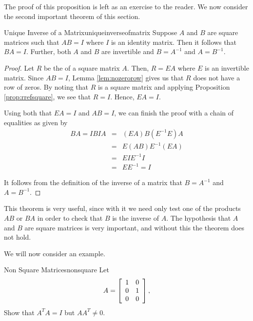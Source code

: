 The proof of this proposition is left as an exercise to the reader. 
We now consider the second important theorem of this section. 

\begin{theorem}{Unique Inverse of a Matrix}{uniqueinverseofmatrix}
Suppose $A$ and $B$ are square matrices such that $AB=I$ where $I$ is an identity matrix. Then it follows that $BA=I$. Further, both $A$ and $B$ are invertible and $B=A^{-1}$ and $A=B^{-1}$.
\end{theorem}

\begin{proof}
Let $R$ be the {\rref} of a square matrix $A$. Then, $R=EA$ where $E$ is an invertible matrix. Since $AB=I$, Lemma \ref{lem:nozerorow} gives us that $R$ does not have a row of zeros. By noting that $R$ is a square matrix and applying Proposition \ref{prop:rrefsquare}, we see that $R=I$. Hence, $EA=I$. 

Using both that $EA=I$ and $AB=I$, we can finish the proof with a chain of equalities as given by
\begin{eqnarray*}
BA = IBIA &=& (EA)B(E^{-1}E)A \\
&=& E(AB)E^{-1}(EA) \\
&=& EIE^{-1}I \\
&=& EE^{-1} = I
\end{eqnarray*}

It follows from the definition of the inverse of a matrix that $B=A^{-1}$ and $A=B^{-1}$.
\end{proof}

This theorem is very useful, since with it we need only test one of the products $AB$ or $BA$ in order to check that $B$ is the inverse of $A$. The hypothesis that $A$ and $B$ are square matrices is very important, and without this the theorem does not hold.

We will now consider an example.

\begin{example}{Non Square Matrices}{nonsquare}
Let 
\begin{equation*}
A =
\left[
\begin{array}{rr}
1 & 0 \\
0 & 1 \\
0 & 0 
\end{array}
\right],
\end{equation*}
Show that $A^{T}A = I$ but $AA^{T} \neq 0$. 
\end{example}

